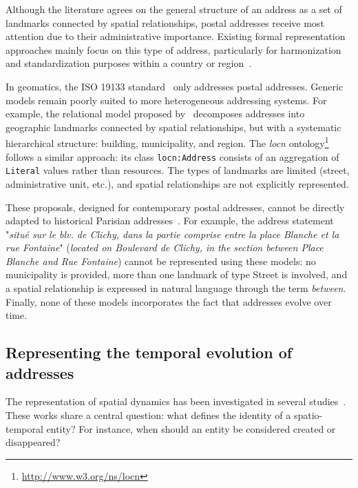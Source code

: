Although the literature agrees on the general structure of an address as a set of landmarks connected by spatial relationships, postal addresses receive most attention due to their administrative importance.
Existing formal representation approaches mainly focus on this type of address, particularly for harmonization and standardization purposes within a country or region~\cite{coetzee_towards_2011,coetzee_what_2007,zandbergen_comparison_2008,borkar_automatically_2000}.

In geomatics, the ISO 19133 standard~\cite{iso_19133_2005} only addresses postal addresses.
Generic models remain poorly suited to more heterogeneous addressing systems.
For example, the relational model proposed by~\cite{davis_assessing_2007} decomposes addresses into geographic landmarks connected by spatial relationships, but with a systematic hierarchical structure: building, municipality, and region.
The \textit{locn} ontology\footnote{\url{http://www.w3.org/ns/locn}} follows a similar approach: its class \texttt{locn:Address} consists of an aggregation of \texttt{Literal} values rather than resources.
The types of landmarks are limited (street, administrative unit, etc.), and spatial relationships are not explicitly represented.

These proposals, designed for contemporary postal addresses, cannot be directly adapted to historical Parisian addresses~\cite{cura_historical_2018}.
For example, the address statement "\textit{situé sur le blv. de Clichy, dans la partie comprise entre la place Blanche et la rue Fontaine}" (\textit{located on Boulevard de Clichy, in the section between Place Blanche and Rue Fontaine}) cannot be represented using these models: no municipality is provided, more than one landmark of type Street is involved, and a spatial relationship is expressed in natural language through the term \textit{between}.
Finally, none of these models incorporates the fact that addresses evolve over time.

\subsection{Representing the temporal evolution of addresses}
\label{subsect:modelisation_evol_temp}

The representation of spatial dynamics has been investigated in several studies~\cite{hallot_identite_2012,carver_qualitative_1998,fan_time-based_2010,del_mondo_modegraphe_2011}.
These works share a central question: what defines the identity of a spatio-temporal entity?
For instance, when should an entity be considered created or disappeared?

